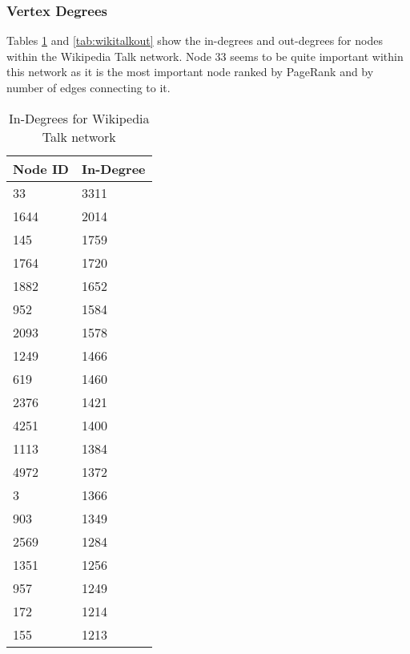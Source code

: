 \subsubsection{Vertex Degrees}
Tables \ref{tab:wikitalkin} and \ref{tab:wikitalkout} show the in-degrees and out-degrees for nodes within the Wikipedia Talk network. Node 33 seems to be quite important within this network as it is the most important node ranked by PageRank and by number of edges connecting to it.

\begin{table}[htbp]%
\centering
\begin{tabular}{|l|l|}
\hline
Node ID & In-Degree \\
\hline
33 & 3311 \\
1644 & 2014 \\
145 & 1759 \\
1764 & 1720 \\
1882 & 1652 \\
952 & 1584 \\
2093 & 1578 \\
1249 & 1466 \\
619 & 1460 \\
2376 & 1421 \\
4251 & 1400 \\
1113 & 1384 \\
4972 & 1372 \\
3 & 1366 \\
903 & 1349 \\
2569 & 1284 \\
1351 & 1256 \\
957 & 1249 \\
172 & 1214 \\
155 & 1213 \\
\hline
\end{tabular}
\caption{In-Degrees for Wikipedia Talk network}
\label{tab:wikitalkin}
\end{table}

